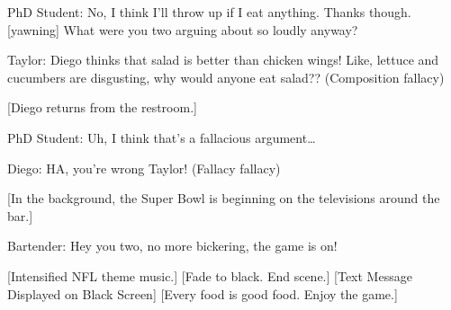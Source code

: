 \documentclass{article}
\begin{document}
PhD Student: No, I think I’ll throw up if I eat anything. Thanks though. [yawning] What were you two arguing about so loudly anyway?

Taylor: Diego thinks that salad is better than chicken wings! Like, lettuce and cucumbers are disgusting, why would anyone eat salad?? (Composition fallacy)

[Diego returns from the restroom.]

PhD Student: Uh, I think that’s a fallacious argument…

Diego: HA, you’re wrong Taylor! (Fallacy fallacy) 

[In the background, the Super Bowl is beginning on the televisions around the bar.]

Bartender: Hey you two, no more bickering, the game is on!

[Intensified NFL theme music.]
[Fade to black. End scene.]
[Text Message Displayed on Black Screen] [Every food is good food. Enjoy the game.]
\end{document}
